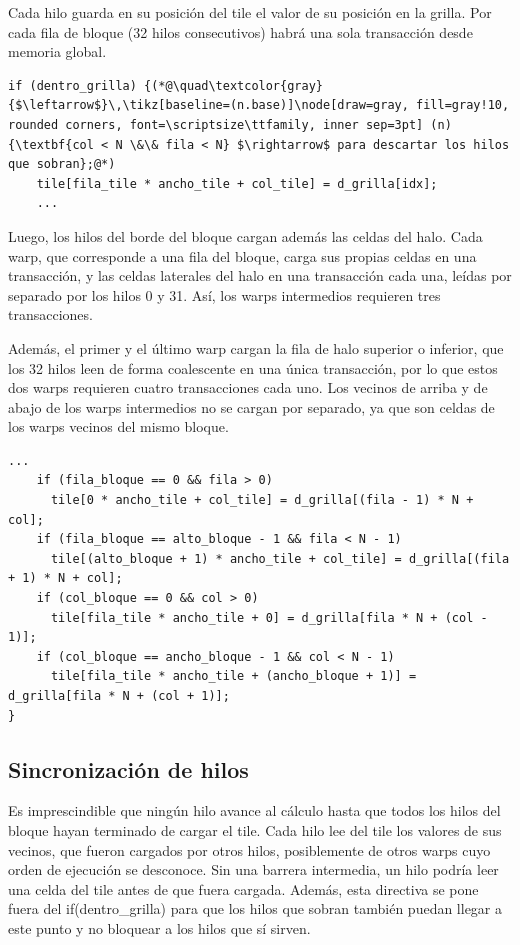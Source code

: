 Cada hilo guarda en su posición del tile el valor de su posición en la grilla. Por cada fila de bloque (32 hilos consecutivos) habrá una sola transacción desde memoria global.
\begin{lstlisting}[firstnumber=123]
if (dentro_grilla) {(*@\quad\textcolor{gray}{$\leftarrow$}\,\tikz[baseline=(n.base)]\node[draw=gray, fill=gray!10, rounded corners, font=\scriptsize\ttfamily, inner sep=3pt] (n) {\textbf{col < N \&\& fila < N} $\rightarrow$ para descartar los hilos que sobran};@*)
    tile[fila_tile * ancho_tile + col_tile] = d_grilla[idx];
    ...
\end{lstlisting}

Luego, los hilos del borde del bloque cargan además las celdas del halo. Cada warp, que corresponde a una fila del bloque, carga sus propias celdas en una transacción, y las celdas laterales del halo en una transacción cada una, leídas por separado por los hilos 0 y 31. Así, los warps intermedios requieren tres transacciones.

Además, el primer y el último warp cargan la fila de halo superior o inferior, que los 32 hilos leen de forma coalescente en una única transacción, por lo que estos dos warps requieren cuatro transacciones cada uno. Los vecinos de arriba y de abajo de los warps intermedios no se cargan por separado, ya que son celdas de los warps vecinos del mismo bloque.

\begin{lstlisting}[firstnumber=125]
    ...
    if (fila_bloque == 0 && fila > 0)
      tile[0 * ancho_tile + col_tile] = d_grilla[(fila - 1) * N + col];
    if (fila_bloque == alto_bloque - 1 && fila < N - 1)
      tile[(alto_bloque + 1) * ancho_tile + col_tile] = d_grilla[(fila + 1) * N + col];
    if (col_bloque == 0 && col > 0)
      tile[fila_tile * ancho_tile + 0] = d_grilla[fila * N + (col - 1)];
    if (col_bloque == ancho_bloque - 1 && col < N - 1)
      tile[fila_tile * ancho_tile + (ancho_bloque + 1)] = d_grilla[fila * N + (col + 1)];
}
\end{lstlisting}

\subsection{Sincronización de hilos}
Es imprescindible que ningún hilo avance al cálculo hasta que todos los hilos del bloque hayan terminado de cargar el tile. Cada hilo lee del tile los valores de sus vecinos, que fueron cargados por otros hilos, posiblemente de otros warps cuyo orden de ejecución se desconoce. Sin una barrera intermedia, un hilo podría leer una celda del tile antes de que fuera cargada. Además, esta directiva se pone fuera del if(dentro\_grilla) para que los hilos que sobran también puedan llegar a este punto y no bloquear a los hilos que sí sirven.

